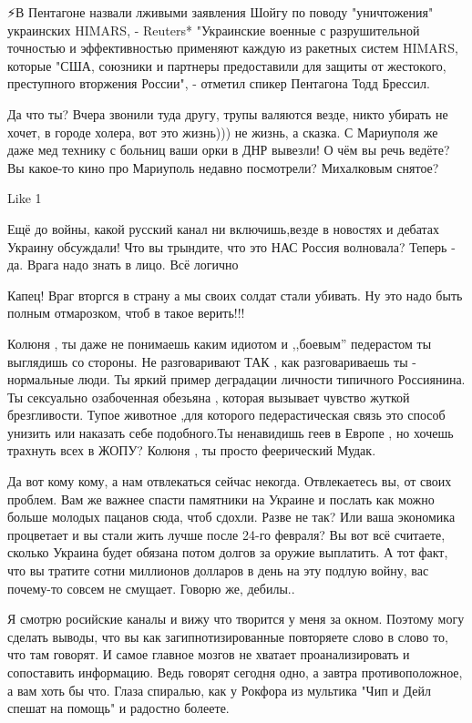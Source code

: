 ⚡️В Пентагоне назвали лживыми заявления Шойгу по поводу "уничтожения"
украинских HIMARS, - Reuters* "Украинские военные с разрушительной точностью и
эффективностью применяют каждую из ракетных систем HIMARS, которые "США,
союзники и партнеры предоставили для защиты от жестокого, преступного вторжения
России", - отметил спикер Пентагона Тодд Брессил.

Да что ты? Вчера звонили туда другу, трупы валяются везде, никто убирать не
хочет, в городе холера, вот это жизнь))) не жизнь, а сказка. С Мариуполя же
даже мед технику с больниц ваши орки в ДНР вывезли! О чём вы речь ведёте? Вы
какое-то кино про Мариуполь недавно посмотрели? Михалковым снятое?

    Like 1

Ещё до войны, какой русский канал ни включишь,везде в новостях и дебатах
Украину обсуждали! Что вы трындите, что это НАС Россия волновала? Теперь - да.
Врага надо знать в лицо. Всё логично

Капец! Враг вторгся в страну а мы своих солдат стали убивать. Ну это надо быть
полным отмарозком, чтоб в такое верить!!!

Колюня , ты даже не понимаешь каким идиотом и ,,боевым'' педерастом ты
выглядишь со стороны. Не разговаривают ТАК , как разговариваешь ты - нормальные
люди. Ты яркий пример деградации личности типичного Россиянина. Ты сексуально
озабоченная обезьяна , которая вызывает чувство жуткой брезгливости. Тупое
животное ,для которого педерастическая связь это способ унизить или наказать
себе подобного.Ты ненавидишь геев в Европе , но хочешь трахнуть всех в ЖОПУ?
Колюня , ты просто феерический Мудак.


Да вот кому кому, а нам отвлекаться сейчас некогда. Отвлекаетесь вы, от своих
проблем. Вам же важнее спасти памятники на Украине и послать как можно больше
молодых пацанов сюда, чтоб сдохли. Разве не так? Или ваша экономика процветает
и вы стали жить лучше после 24-го февраля? Вы вот всё считаете, сколько Украина
будет обязана потом долгов за оружие выплатить. А тот факт, что вы тратите
сотни миллионов долларов в день на эту подлую войну, вас почему-то совсем не
смущает. Говорю же, дебилы..

Я смотрю росийские каналы и вижу что творится у меня за окном. Поэтому могу
сделать выводы, что вы как загипнотизированные повторяете слово в слово то, что
там говорят. И самое главное мозгов не хватает проанализировать и сопоставить
информацию. Ведь говорят сегодня одно, а завтра противоположное, а вам хоть бы
что. Глаза спиралью, как у Рокфора из мультика "Чип и Дейл спешат на помощь" и
радостно болеете.

